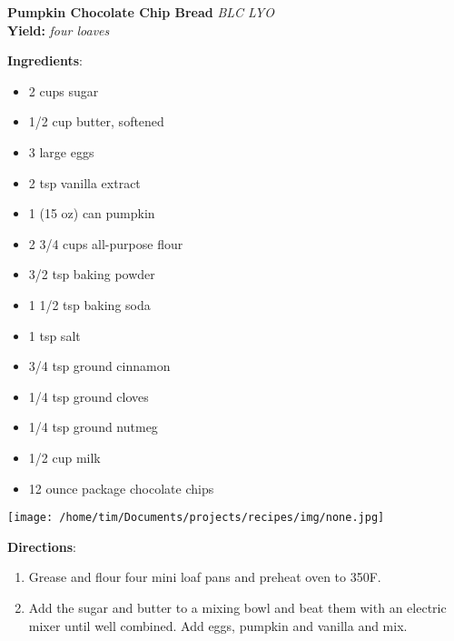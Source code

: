 \documentclass[11pt, twoside, openany]{book}
\begin{document}
\noindent\begin{minipage}[t]{\linewidth}%
{\Large\textbf{Pumpkin Chocolate Chip Bread}} \label{pumpkin-chocolate-chip-bread}\hfill\textit{BLC LYO}\\
\textbf{Yield:} \textit{four loaves}\\
\noindent\begin{minipage}[t]{0.78\linewidth}%
\textbf{Ingredients}:\vspace{-3mm}
\begin{multicols}{2}
\begin{itemize}\setlength\itemsep{-1mm}
\item 2 cups sugar
\item 1/2 cup butter, softened
\item 3 large eggs
\item 2 tsp vanilla extract
\item 1 (15 oz) can pumpkin
\item 2 3/4 cups all-purpose flour
\item 3/2 tsp baking powder
\item 1 1/2 tsp baking soda
\item 1 tsp salt
\item 3/4 tsp ground cinnamon
\item 1/4 tsp ground cloves
\item 1/4 tsp ground nutmeg
\item 1/2 cup milk
\item 12 ounce package chocolate chips
\end{itemize}
\end{multicols}
\end{minipage}
\noindent\begin{minipage}[t]{0.18\linewidth}
\centering \strut\vspace*{-\baselineskip}\newline
\texttt{[image: /home/tim/Documents/projects/recipes/img/none.jpg]}\\
\end{minipage}\vspace{3mm}
\textbf{Directions}:
\vspace{-3mm}\begin{enumerate}\setlength\itemsep{-1mm}
\item Grease and flour four mini loaf pans and preheat oven to 350F.
\item Add the sugar and butter to a mixing bowl and beat them with an electric mixer until well combined. Add eggs, pumpkin and vanilla and mix.

\end{enumerate}
\end{minipage}
\end{document}
